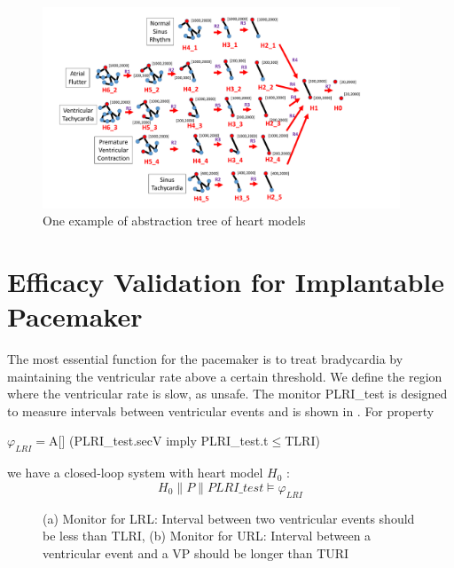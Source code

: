  \begin{figure}[!t]
	\centering
	\includegraphics[width=0.95\textwidth]{figs/abs_tree.pdf}
	\caption{\small One example of abstraction tree of heart models}
	\label{fig:HM_abs}
\end{figure}


\section{Efficacy Validation for Implantable Pacemaker}
The most essential function for the pacemaker is to treat bradycardia by maintaining the ventricular rate above a certain threshold. We define the region where the ventricular rate is slow, as \textsf{unsafe}. The monitor \textsf{PLRI\_test} is designed to measure intervals between ventricular events and is shown in . For property
\begin{center}
\textsf{$\varphi_{LRI}=$A[] (PLRI\_test.secV imply PLRI\_test.t$\leq$TLRI)}
\end{center}
we have a closed-loop system with heart model $H_0$ : 
$$H_0\| P\| PLRI\_test\models\varphi_{LRI}$$

\begin{figure}[b]
\centering
	\caption{(a) Monitor for LRL: Interval between two ventricular events should be less than TLRI, (b) Monitor for URL: Interval between a ventricular event and a VP should be longer than TURI}
\end{figure} 

